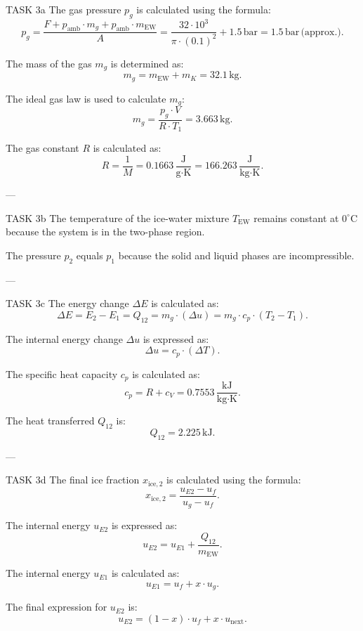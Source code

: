 TASK 3a  
The gas pressure \( p_g \) is calculated using the formula:  
\[
p_g = \frac{F + p_{\text{amb}} \cdot m_g + p_{\text{amb}} \cdot m_{\text{EW}}}{A} = \frac{32 \cdot 10^3}{\pi \cdot (0.1)^2} + 1.5 \, \text{bar} = 1.5 \, \text{bar} \, \text{(approx.)}.
\]  

The mass of the gas \( m_g \) is determined as:  
\[
m_g = m_{\text{EW}} + m_K = 32.1 \, \text{kg}.
\]  

The ideal gas law is used to calculate \( m_g \):  
\[
m_g = \frac{p_g \cdot V}{R \cdot T_1} = 3.663 \, \text{kg}.
\]  

The gas constant \( R \) is calculated as:  
\[
R = \frac{1}{M} = 0.1663 \, \frac{\text{J}}{\text{g·K}} = 166.263 \, \frac{\text{J}}{\text{kg·K}}.
\]  

---

TASK 3b  
The temperature of the ice-water mixture \( T_{\text{EW}} \) remains constant at \( 0^\circ\text{C} \) because the system is in the two-phase region.  

The pressure \( p_2 \) equals \( p_1 \) because the solid and liquid phases are incompressible.  

---

TASK 3c  
The energy change \( \Delta E \) is calculated as:  
\[
\Delta E = E_2 - E_1 = Q_{12} = m_g \cdot (\Delta u) = m_g \cdot c_p \cdot (T_2 - T_1).
\]  

The internal energy change \( \Delta u \) is expressed as:  
\[
\Delta u = c_p \cdot (\Delta T).
\]  

The specific heat capacity \( c_p \) is calculated as:  
\[
c_p = R + c_V = 0.7553 \, \frac{\text{kJ}}{\text{kg·K}}.
\]  

The heat transferred \( Q_{12} \) is:  
\[
Q_{12} = 2.225 \, \text{kJ}.
\]  

---

TASK 3d  
The final ice fraction \( x_{\text{ice},2} \) is calculated using the formula:  
\[
x_{\text{ice},2} = \frac{u_{E2} - u_f}{u_g - u_f}.
\]  

The internal energy \( u_{E2} \) is expressed as:  
\[
u_{E2} = u_{E1} + \frac{Q_{12}}{m_{\text{EW}}}.
\]  

The internal energy \( u_{E1} \) is calculated as:  
\[
u_{E1} = u_f + x \cdot u_g.
\]  

The final expression for \( u_{E2} \) is:  
\[
u_{E2} = (1 - x) \cdot u_f + x \cdot u_{\text{next}}.
\]  